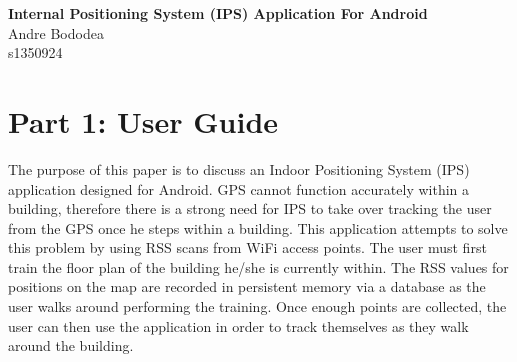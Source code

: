 \documentclass[10.8pt]{article}
\begin{document}



\begingroup  
\vspace{2em}
  \centering
  \LARGE \textbf{Internal Positioning System (IPS) Application For Android\\[0.4em]}
  \large Andre Bododea \\[0.2em]
  \large s1350924 \par

\endgroup


\vspace{1em}

\section*{Part 1: User Guide}

The purpose of this paper is to discuss an Indoor Positioning System (IPS) application designed for Android. GPS cannot function accurately within a building, therefore there is a strong need for IPS to take over tracking the user from the GPS once he steps within a building. This application attempts to solve this problem by using RSS scans from WiFi access points. The user must first train the floor plan of the building he/she is currently within. The RSS values for positions on the map are recorded in persistent memory via a database as the user walks around performing the training. Once enough points are collected, the user can then use the application in order to track themselves as they walk around the building.

\vspace{1em}
\end{document}
